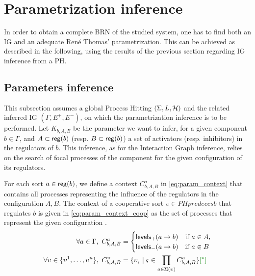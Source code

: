 \section{Parametrization inference}


In order to obtain a complete BRN of the studied system, one has to find both an IG and an adequate René Thomas' parametrization. This can be achieved as described in the following, using the results of the previous section regarding IG inference from a PH.

\subsection{Parameters inference}
This subsection assumes a global Process Hitting $(\Sigma,L,\mathcal{H})$ and the related inferred IG $(\Gamma, E^+, E^-)$, on which the parametrization inference is to be performed. Let $K_{b,A,B}$ be the parameter we want to infer, for a given component $b \in \Gamma$, and $A \subset \mathsf{reg}({b})$ (resp. $B \subset \mathsf{reg}({b})$)  a set of activators (resp. inhibitors) in the regulators of $b$. This inference, as for the Interaction Graph inference, relies on the search of focal processes of the component for the given configuration of its regulators.

For each sort $a \in \mathsf{reg}({b})$, we define a context $C^a_{b,A,B}$ in \eqref{eq:param_context} that contains all processes representing the influence of the regulators in the configuration $A,B$. The context of a cooperative sort $\upsilon \in PHpredeccs{b}$ that regulates $b$ is given in \eqref{eq:param_context_coop} as the set of processes that represent the given configuration .
\begin{align}
\label{eq:param_context}
\forall a\in\Gamma,~
C_{b,A,B}^a & = \begin{cases}
\levelsA{a}{b} & \text{if $a \in A$,}\\
\levelsI{a}{b} & \text{if $a \in B$}
\end{cases}
\\
\label{eq:param_context_coop}
\forall \upsilon \in \{\upsilon^1, \dots, \upsilon^u\},~
C_{b,A,B}^\upsilon & = \{
\upsilon_\varsigma \mid \varsigma \in \prod_{a \in \Sigma(\upsilon)}C_{b,A,B}^a \} \todo{^*}
\end{align}

